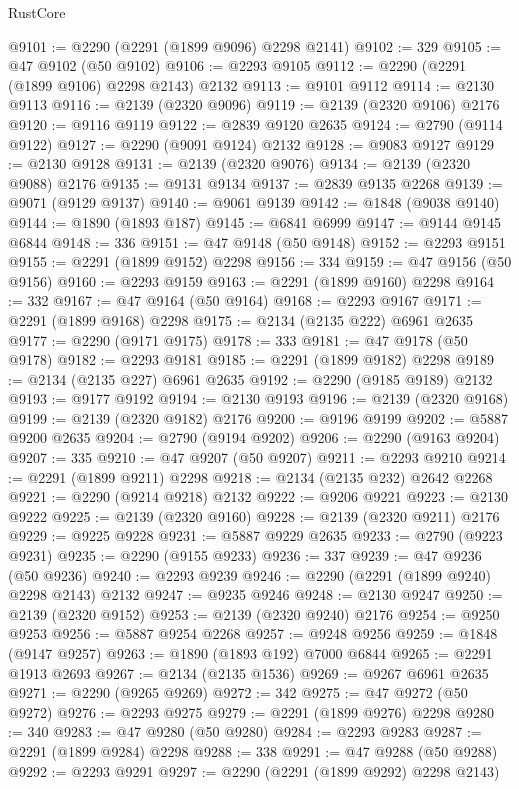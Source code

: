 \begin{lexlean}{RustCore}
\begin{coremodule}
@9101 := @2290 (@2291 (@1899 @9096) @2298 @2141)
@9102 := 329
@9105 := @47 @9102 (@50 @9102)
@9106 := @2293 @9105
@9112 := @2290 (@2291 (@1899 @9106) @2298 @2143) @2132
@9113 := @9101 @9112
@9114 := @2130 @9113
@9116 := @2139 (@2320 @9096)
@9119 := @2139 (@2320 @9106) @2176
@9120 := @9116 @9119
@9122 := @2839 @9120 @2635
@9124 := @2790 (@9114 @9122)
@9127 := @2290 (@9091 @9124) @2132
@9128 := @9083 @9127
@9129 := @2130 @9128
@9131 := @2139 (@2320 @9076)
@9134 := @2139 (@2320 @9088) @2176
@9135 := @9131 @9134
@9137 := @2839 @9135 @2268
@9139 := @9071 (@9129 @9137)
@9140 := @9061 @9139
@9142 := @1848 (@9038 @9140)
@9144 := @1890 (@1893 @187)
@9145 := @6841 @6999
@9147 := @9144 @9145 @6844
@9148 := 336
@9151 := @47 @9148 (@50 @9148)
@9152 := @2293 @9151
@9155 := @2291 (@1899 @9152) @2298
@9156 := 334
@9159 := @47 @9156 (@50 @9156)
@9160 := @2293 @9159
@9163 := @2291 (@1899 @9160) @2298
@9164 := 332
@9167 := @47 @9164 (@50 @9164)
@9168 := @2293 @9167
@9171 := @2291 (@1899 @9168) @2298
@9175 := @2134 (@2135 @222) @6961 @2635
@9177 := @2290 (@9171 @9175)
@9178 := 333
@9181 := @47 @9178 (@50 @9178)
@9182 := @2293 @9181
@9185 := @2291 (@1899 @9182) @2298
@9189 := @2134 (@2135 @227) @6961 @2635
@9192 := @2290 (@9185 @9189) @2132
@9193 := @9177 @9192
@9194 := @2130 @9193
@9196 := @2139 (@2320 @9168)
@9199 := @2139 (@2320 @9182) @2176
@9200 := @9196 @9199
@9202 := @5887 @9200 @2635
@9204 := @2790 (@9194 @9202)
@9206 := @2290 (@9163 @9204)
@9207 := 335
@9210 := @47 @9207 (@50 @9207)
@9211 := @2293 @9210
@9214 := @2291 (@1899 @9211) @2298
@9218 := @2134 (@2135 @232) @2642 @2268
@9221 := @2290 (@9214 @9218) @2132
@9222 := @9206 @9221
@9223 := @2130 @9222
@9225 := @2139 (@2320 @9160)
@9228 := @2139 (@2320 @9211) @2176
@9229 := @9225 @9228
@9231 := @5887 @9229 @2635
@9233 := @2790 (@9223 @9231)
@9235 := @2290 (@9155 @9233)
@9236 := 337
@9239 := @47 @9236 (@50 @9236)
@9240 := @2293 @9239
@9246 := @2290 (@2291 (@1899 @9240) @2298 @2143) @2132
@9247 := @9235 @9246
@9248 := @2130 @9247
@9250 := @2139 (@2320 @9152)
@9253 := @2139 (@2320 @9240) @2176
@9254 := @9250 @9253
@9256 := @5887 @9254 @2268
@9257 := @9248 @9256
@9259 := @1848 (@9147 @9257)
@9263 := @1890 (@1893 @192) @7000 @6844
@9265 := @2291 @1913 @2693
@9267 := @2134 (@2135 @1536)
@9269 := @9267 @6961 @2635
@9271 := @2290 (@9265 @9269)
@9272 := 342
@9275 := @47 @9272 (@50 @9272)
@9276 := @2293 @9275
@9279 := @2291 (@1899 @9276) @2298
@9280 := 340
@9283 := @47 @9280 (@50 @9280)
@9284 := @2293 @9283
@9287 := @2291 (@1899 @9284) @2298
@9288 := 338
@9291 := @47 @9288 (@50 @9288)
@9292 := @2293 @9291
@9297 := @2290 (@2291 (@1899 @9292) @2298 @2143)

\end{coremodule}
\end{lexlean}
